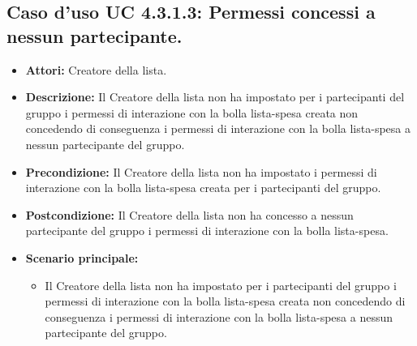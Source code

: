\subsection{Caso d'uso UC 4.3.1.3: Permessi concessi a nessun partecipante.}
\label{Caso d'uso UC 4.3.1.3: Permessi concessi a nessun partecipante.}

\FloatBarrier
\begin{itemize}
\item \textbf{Attori:} Creatore della lista.
\item \textbf{Descrizione:} Il Creatore della lista non ha impostato per i partecipanti del gruppo i permessi di interazione con la bolla lista-spesa creata non concedendo di conseguenza i permessi di interazione con la bolla lista-spesa a nessun partecipante del gruppo.
\item \textbf{Precondizione:} Il Creatore della lista non ha impostato i permessi di interazione con la bolla lista-spesa creata per i partecipanti del gruppo.
\item \textbf{Postcondizione:} Il Creatore della lista non ha concesso a nessun partecipante del gruppo i permessi di interazione con la bolla lista-spesa.
\item \textbf{Scenario principale:}
\begin{itemize}
\item Il Creatore della lista non ha impostato per i partecipanti del gruppo i permessi di interazione con la bolla lista-spesa creata non concedendo di conseguenza i permessi di interazione con la bolla lista-spesa a nessun partecipante del gruppo.
\end{itemize}
\end{itemize}